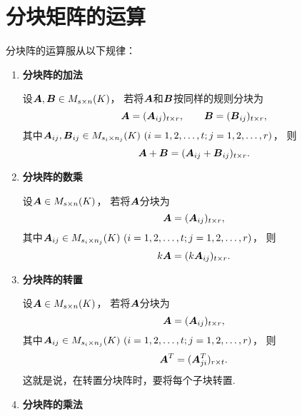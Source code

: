 \section{分块矩阵的运算}
分块阵的运算服从以下规律：
\begin{enumerate}
	\item {\rm\bf 分块阵的加法}

	设\(\boldsymbol{A},\boldsymbol{B} \in M_{s \times n}(K)\)，
	若将\(\boldsymbol{A}\)和\(\boldsymbol{B}\)按同样的规则分块为\begin{equation*}
		\boldsymbol{A}=(\boldsymbol{A}_{ij})_{t \times r}, \qquad
		\boldsymbol{B}=(\boldsymbol{B}_{ij})_{t \times r},
	\end{equation*}
	其中\(\vb{A}_{ij},\vb{B}_{ij}\in M_{s_i \times n_j}(K)\ (i=1,2,\dotsc,t;j=1,2,\dotsc,r)\)，
	则\begin{equation*}
		\boldsymbol{A}+\boldsymbol{B}=(\boldsymbol{A}_{ij}+\boldsymbol{B}_{ij})_{t \times r}.
	\end{equation*}

	\item {\rm\bf 分块阵的数乘}

	设\(\boldsymbol{A}\in M_{s \times n}(K)\)，
	若将\(\boldsymbol{A}\)分块为\begin{equation*}
		\boldsymbol{A}=(\boldsymbol{A}_{ij})_{t \times r},
	\end{equation*}
	其中\(\vb{A}_{ij}\in M_{s_i \times n_j}(K)\ (i=1,2,\dotsc,t;j=1,2,\dotsc,r)\)，
	则\begin{equation*}
		k\boldsymbol{A}=(k\boldsymbol{A}_{ij})_{t \times r}.
	\end{equation*}

	\item {\rm\bf 分块阵的转置}

	设\(\boldsymbol{A}\in M_{s \times n}(K)\)，
	若将\(\boldsymbol{A}\)分块为\begin{equation*}
		\boldsymbol{A}=(\boldsymbol{A}_{ij})_{t \times r},
	\end{equation*}
	其中\(\vb{A}_{ij}\in M_{s_i \times n_j}(K)\ (i=1,2,\dotsc,t;j=1,2,\dotsc,r)\)，
	则\begin{equation*}
		\boldsymbol{A}^T=(\boldsymbol{A}_{ji}^T)_{r \times t}.
	\end{equation*}
	这就是说，在转置分块阵时，要将每个子块转置.

	\item {\rm\bf 分块阵的乘法}


\end{enumerate}
